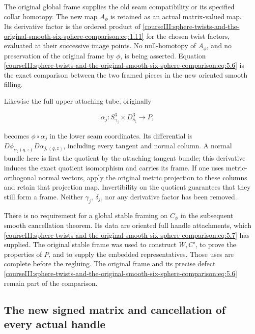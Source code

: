 The original global frame supplies the old seam compatibility or its specified collar homotopy. The new map \(A_\phi\) is retained as an actual matrix-valued map. Its derivative factor is the ordered product of \eqref{courseIII:sphere-twists-and-the-original-smooth-six-sphere-comparison:eq:1.11} for the chosen twist factors, evaluated at their successive image points. No null-homotopy of \(A_\phi\), and no preservation of the original frame by \(\phi\), is being asserted. Equation \eqref{courseIII:sphere-twists-and-the-original-smooth-six-sphere-comparison:eq:5.6} is the exact comparison between the two framed pieces in the new oriented smooth filling.

Likewise the full upper attaching tube, originally

\begin{equation}
\alpha_j:S^3_{\gamma_j}\times D^3_{\delta_j}\longrightarrow P,
 \label{courseIII:sphere-twists-and-the-original-smooth-six-sphere-comparison:eq:5.7}
\end{equation}

becomes \(\phi\circ\alpha_j\) in the lower seam coordinates. Its differential is \(D\phi_{\alpha_j(q,z)}D\alpha_{j,(q,z)}\), including every tangent and normal column. A normal bundle here is first the quotient by the attaching tangent bundle; this derivative induces the exact quotient isomorphism and carries its frame. If one uses metric-orthogonal normal vectors, apply the original metric projection to these columns and retain that projection map. Invertibility on the quotient guarantees that they still form a frame. Neither \(\gamma_j\), \(\delta_j\), nor any derivative factor has been removed.

There is no requirement for a global stable framing on \(C_\phi\) in the subsequent smooth cancellation theorem. Its data are oriented full handle attachments, which \eqref{courseIII:sphere-twists-and-the-original-smooth-six-sphere-comparison:eq:5.7} has supplied. The original stable frame was used to construct \(W,C'\), to prove the properties of \(P\), and to supply the embedded representatives. Those uses are complete before the regluing. The original frame and its precise defect \eqref{courseIII:sphere-twists-and-the-original-smooth-six-sphere-comparison:eq:5.6} remain part of the comparison.

\subsection{The new signed matrix and cancellation of every actual handle}
\label{courseIII:sphere-twists-and-the-original-smooth-six-sphere-comparison:twist-actual-cancellation}

